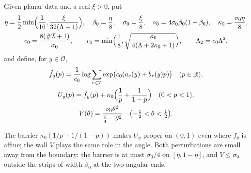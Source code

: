 \begin{definition}\label{def:plc-constants}
Given planar data and a real $\xi>0$, put
\begin{gather*}
 \eta=\frac12\min\Bigl(\frac1{16},\frac{\xi}{32(\Lambda+1)}\Bigr),\quad \beta_0=\frac\eta8,\quad \sigma_0=\frac\xi8,\quad
 \nu_0=4\sigma_0\beta_0(1-\beta_0),\quad \kappa_0=\frac{\sigma_0\eta}8,\\
 c_0=\frac{8(\#\mathcal I+1)}{\sigma_0},\qquad r_0=\min\Bigl(\frac18,\sqrt{\frac{\kappa_0}{4(\Lambda+2\kappa_0+1)}}\Bigr),\qquad
 \Lambda_2=c_0\Lambda^2,
\end{gather*}
and define, for $y\in\mathcal O$,
\begin{gather*}
 \tilde f_y(p)=\frac1{c_0}\log\sum_{r\in\mathcal I}\exp\bigl(c_0(a_r(y)+b_r(y)p)\bigr)\quad(p\in\mathbb{R}),\\
 U_y(p)=\tilde f_y(p)+\kappa_0\Bigl(\frac1p+\frac1{1-p}\Bigr)\quad(0<p<1),\\
 V(\theta)=\frac{\nu_0\theta^2}{\frac14-\theta^2}\quad\bigl(-\tfrac12<\theta<\tfrac12\bigr).
\end{gather*}
\end{definition}

The barrier $\kappa_0(1/p+1/(1-p))$ makes $U_y$ proper on $(0,1)$ even where $f_y$ is
affine; the wall $V$ plays the same role in the angle. Both perturbations are small away from the boundary: the
barrier is at most $\sigma_0/4$ on $[\eta,1-\eta]$, and $V\le\sigma_0$ outside the strips of width $\beta_0$ at the two
angular ends.

